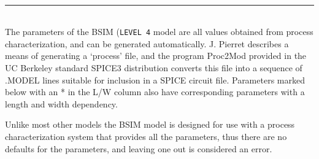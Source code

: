 \clearpage
{}\\
\noindent\rule{\textwidth}{0.5mm}\\[0.2in]

The parameters of the BSIM ({\tt LEVEL 4} model are  all  values
obtained  from
process  characterization,  and  can  be generated automatically.
J. Pierret \cite{pierret:84} describes a  means  of  generating  a
`process'  file,  and  the  program  Proc2Mod  provided in the UC Berkeley
standard SPICE3 distribution converts this file  into  a  sequence  of  .MODEL
lines  suitable  for  inclusion  in  a  SPICE  circuit file.
Parameters marked below with an * in  the  L/W  column  also
have corresponding parameters with a length and width dependency.


Unlike most other models the  BSIM
model  is  designed  for use with a process characterization
system that provides all the parameters, thus there  are  no
defaults  for  the  parameters,  and leaving one out is considered
an error.

